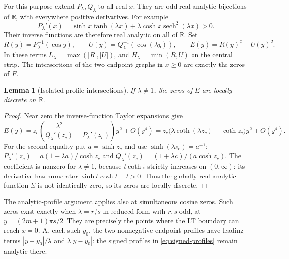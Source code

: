 \documentclass[11pt]{article}
\numberwithin{equation}{section}
\newtheorem{lemma}[theorem]{Lemma}
\theoremstyle{definition}
\newcommand{\R}{\mathbb R}
\begin{document}
For this purpose extend $P_\lambda,Q_\lambda$ to all real $x$.
They are odd real-analytic bijections of $\R$, with everywhere
positive derivatives.  For example
\[
 P_\lambda'(x)=\sinh x\tanh(\lambda x)
                  +\lambda\cosh x\operatorname{sech}^2(\lambda x)>0.
\]
Their inverse functions are therefore real analytic on all of $\R$.
Set
\begin{equation}\label{eq:signed-profiles}
 R(y)=P_\lambda^{-1}(\cos y),\qquad
 U(y)=Q_\lambda^{-1}(\cos(\lambda y)),\qquad
 E(y)=R(y)^2-U(y)^2.
\end{equation}
In these terms $L_\lambda=\max(|R|,|U|)$, and
$H_\lambda=\min(R,U)$ on the central strip.
The intersections of the two endpoint graphs in $x\ge0$ are
exactly the zeros of $E$.

\begin{lemma}[Isolated profile intersections]\label{lem:profile-discrete}
If $\lambda\ne1$, the zeros of $E$ are locally discrete on $\R$.
\end{lemma}
\begin{proof}
Near zero the inverse-function Taylor expansions give
\[
 E(y)=z_c\left(\frac{\lambda^2}{Q_\lambda'(z_c)}
                      -\frac1{P_\lambda'(z_c)}\right)y^2+O(y^4)
     =z_c\bigl(\lambda\coth(\lambda z_c)-\coth z_c\bigr)y^2
       +O(y^4).
\]
For the second equality put $a=\sinh z_c$ and use
$\sinh(\lambda z_c)=a^{-1}$:
$P_\lambda'(z_c)=a(1+\lambda a)/\cosh z_c$ and
$Q_\lambda'(z_c)=(1+\lambda a)/(a\cosh z_c)$.
The coefficient is nonzero for $\lambda\ne1$, because $t\coth t$
strictly increases on $(0,\infty)$:
its derivative has numerator $\sinh t\cosh t-t>0$.
Thus the globally real-analytic function $E$ is not identically
zero, so its zeros are locally discrete.
\end{proof}

The analytic-profile argument applies also at simultaneous cosine zeros.
Such zeros exist exactly when $\lambda=r/s$ in reduced form
with $r,s$ odd, at $y=(2m+1)\pi s/2$.  They are precisely the
points where the LT boundary can reach $x=0$.  At each such $y_0$,
the two nonnegative endpoint profiles have leading terms
$|y-y_0|/\lambda$ and $\lambda|y-y_0|$; the signed profiles in
\eqref{eq:signed-profiles} remain analytic there.
\end{document}
